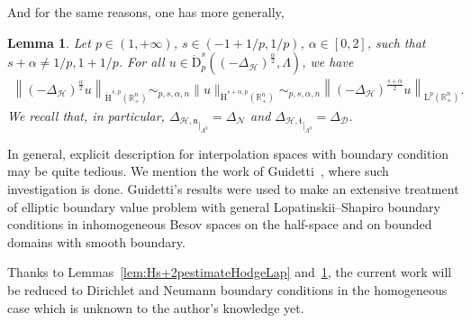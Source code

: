 \documentclass[10pt]{amsart}
\newtheorem{lemm}[theo]{Lemma}\newtheorem{prop}[theo]{Proposition}\newtheorem{coro}[theo]{Corollary}\newtheorem{conj}[theo]{Conjecture}
\theoremstyle{definition}\newtheorem{defi}[theo]{Definition}\newtheorem{rema}[theo]{Remark}\newtheorem{exam}[theo]{Example}\newtheorem{exem}[theo]{Example}\newtheorem{nota}[theo]{Notation}
\newcommand{\bbR}{\mathbb{R}}
\newcommand{\rmH}{\mathrm{H}}%
\newcommand{\rmD}{\mathrm{D}}
\newcommand{\rmL}{\mathrm{L}}
\newcommand{\clH}{\mathcal{H}}
\newcommand{\clN}{\mathcal{N}}
\newcommand{\clD}{\mathcal{D}}
\newcommand{\fkn}{\mathfrak{n}}
\newcommand{\fkt}{\mathfrak{t}}
\begin{document}
And for the same reasons, one has more generally,

\begin{lemm}\label{lem:FractionalSobestimateHodgeLap}
Let $p\in(1,+\infty)$, $s\in(-1+1/p,1/p)$, $\alpha\in[0,2]$, such that $s+\alpha\neq 1/p,1+1/p$. For all $u \in\dot{\rmD}^{s}_{p}((-{{\Delta}}_{\clH})^\frac{\alpha}{2},\Lambda)$, we have
\begin{align*}
\left\| (-{{\Delta}}_{\clH})^\frac{\alpha}{2} u \right\|_{\dot{\rmH}^{s,p}\left(\bbR^n_+\right)} \sim_{p,s,\alpha,n} \| u \|_{\dot{\rmH}^{s+\alpha,p}\left(\bbR^n_+\right)}\sim_{p,s,\alpha,n} \left\| (-{{\Delta}}_{\clH})^\frac{s+\alpha}{2} u \right\|_{\rmL^{p}\left(\bbR^n_+\right)}.
\end{align*}
We recall that, in particular, ${\Delta_{\clH,\fkn}}_{|_{\Lambda^0}}=\Delta_{\clN}$ and ${\Delta_{\clH,\fkt}}_{|_{\Lambda^0}}=\Delta_{\clD}$.
\end{lemm}

In general, explicit description for interpolation spaces with boundary condition may be quite tedious. We mention the work of Guidetti~\cite{Guidetti1991Ell,Guidetti1991Interp}, where such investigation is done. Guidetti's results were used to make an extensive treatment of elliptic boundary value problem with general Lopatinskii--Shapiro boundary conditions in inhomogeneous Besov spaces on the half-space and on bounded domains with smooth boundary.

Thanks to Lemmas~\ref{lem:Hs+2pestimateHodgeLap} and~\ref{lem:FractionalSobestimateHodgeLap}, the current work will be reduced to Dirichlet and Neumann boundary conditions in the homogeneous case which is unknown to the author's knowledge yet.
\end{document}
